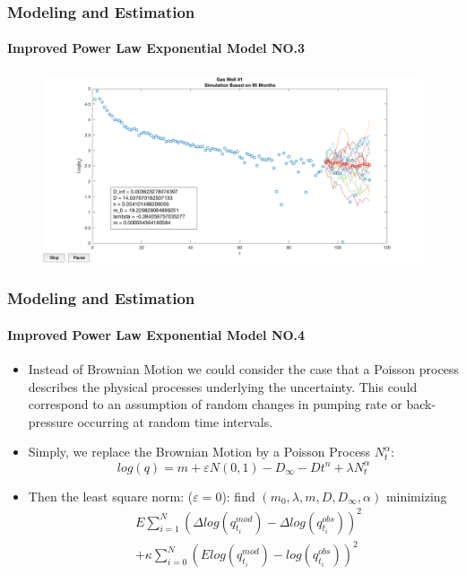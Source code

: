 \documentclass[11pt]{beamer}
\begin{document}
\begin{frame}
	\frametitle{Modeling and Estimation}
	\framesubtitle{Improved Power Law Exponential Model NO.3}
	\justifying
	\begin{figure}
		\begin{center}
			\includegraphics[width=1.1\textwidth  ]{well1} 
		\end{center}
	\end{figure}				
\end{frame}	


\begin{frame}
	\frametitle{Modeling and Estimation}
	\framesubtitle{Improved Power Law Exponential Model NO.4}
	\justifying
	\begin{itemize}
		\item Instead of Brownian Motion we could consider the case that a Poisson process describes the physical processes underlying the uncertainty.  This could correspond to an assumption of random changes in pumping rate or back-pressure occurring at random time intervals.
		\item Simply, we replace the Brownian Motion by a Poisson Process $N_t^{\alpha}$:
		      \begin{equation}
		      	log(q)=m+\varepsilon N(0,1)-D_\infty - Dt^n+\lambda N_t^{\alpha}
		      \end{equation}
		\item Then the least square norm: ($\varepsilon=0$): find $(m_0,\lambda,m,D,D_{\infty},\alpha)$ minimizing
		      \begin{eqnarray*}
		      	&E\sum_{i=1}^N\left(\Delta log(q^{mod}_{t_i})-\Delta log(q^{obs}_{t_{i}}) \right)^2
		      	\\
		      	&
		      	+\kappa\sum_{i=0}^N \left(E log(q^{mod}_{t_i})- log(q^{obs}_{t_{i}}) \right)^2
		      \end{eqnarray*}
	\end{itemize}	
\end{frame}	
\end{document}

